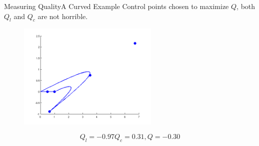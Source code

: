 \documentclass[12pt]{beamer}
\begin{document}
\begin{frame}{Measuring Quality}{A Curved Example}
Control points chosen to maximize $Q$, both $Q_l$ and $Q_c$ are not horrible.
\begin{figure}
  \centering
  \includegraphics[width=0.60\textwidth]{bezier_images/curved3.png} 
\end{figure}
\[Q_l = -0.97 Q_c = 0.31, Q = -0.30\]
\end{frame}
\end{document}
